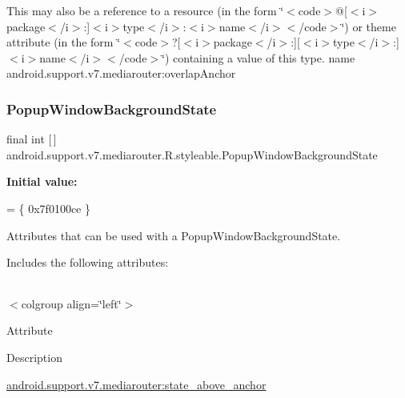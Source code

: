 This may also be a reference to a resource (in the form \char`\"{}$<$code$>$@\mbox{[}$<$i$>$package$<$/i$>$\+:\mbox{]}$<$i$>$type$<$/i$>$\+:$<$i$>$name$<$/i$>$$<$/code$>$\char`\"{}) or theme attribute (in the form \char`\"{}$<$code$>$?\mbox{[}$<$i$>$package$<$/i$>$\+:\mbox{]}\mbox{[}$<$i$>$type$<$/i$>$\+:\mbox{]}$<$i$>$name$<$/i$>$$<$/code$>$\char`\"{}) containing a value of this type.  name android.\+support.\+v7.\+mediarouter\+:overlap\+Anchor \mbox{\label{classandroid_1_1support_1_1v7_1_1mediarouter_1_1R_1_1styleable_a716145c1da7306108d9ae51de6ea6eed}} 
\subsubsection{\texorpdfstring{Popup\+Window\+Background\+State}{PopupWindowBackgroundState}}
{\footnotesize\ttfamily final int \mbox{[}$\,$\mbox{]} android.\+support.\+v7.\+mediarouter.\+R.\+styleable.\+Popup\+Window\+Background\+State\hspace{0.3cm}{\ttfamily [static]}}

{\bfseries Initial value\+:}
\begin{DoxyCode}
= \{
            0x7f0100ce
        \}
\end{DoxyCode}
Attributes that can be used with a Popup\+Window\+Background\+State. 

Includes the following attributes\+:

\tabulinesep=1mm
\begin{longtabu} spread 0pt [c]{*{0}{|X[-1]}|}
\hline
\end{longtabu}
$<$colgroup align=\char`\"{}left\char`\"{}$>$ 

Attribute

Description 

{\ttfamily \hyperlink{classandroid_1_1support_1_1v7_1_1mediarouter_1_1R_1_1styleable_a66e99f54d31428c26c86bfd6a4191e2f}{android.\+support.\+v7.\+mediarouter\+:state\+\_\+above\+\_\+anchor}}

